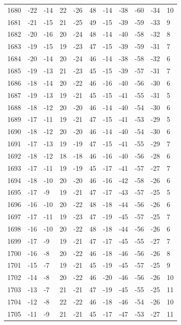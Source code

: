 \begin{table}[H]
\begin{tabular}{lllllllllll}
1680 & -22 & -14 & 22 & -26 & 48 & -14 & -38 & -60 & -34 & 10 \\
1681 & -21 & -15 & 21 & -25 & 49 & -15 & -39 & -59 & -33 & 9 \\
1682 & -20 & -16 & 20 & -24 & 48 & -14 & -40 & -58 & -32 & 8 \\
1683 & -19 & -15 & 19 & -23 & 47 & -15 & -39 & -59 & -31 & 7 \\
1684 & -20 & -14 & 20 & -24 & 46 & -14 & -38 & -58 & -32 & 6 \\
1685 & -19 & -13 & 21 & -23 & 45 & -15 & -39 & -57 & -31 & 7 \\
1686 & -18 & -14 & 20 & -22 & 46 & -16 & -40 & -56 & -30 & 6 \\
1687 & -19 & -13 & 19 & -21 & 45 & -15 & -41 & -55 & -31 & 5 \\
1688 & -18 & -12 & 20 & -20 & 46 & -14 & -40 & -54 & -30 & 6 \\
1689 & -17 & -11 & 19 & -21 & 47 & -15 & -41 & -53 & -29 & 5 \\
1690 & -18 & -12 & 20 & -20 & 46 & -14 & -40 & -54 & -30 & 6 \\
1691 & -17 & -13 & 19 & -19 & 47 & -15 & -41 & -55 & -29 & 7 \\
1692 & -18 & -12 & 18 & -18 & 46 & -16 & -40 & -56 & -28 & 6 \\
1693 & -17 & -11 & 19 & -19 & 45 & -17 & -41 & -57 & -27 & 7 \\
1694 & -18 & -10 & 20 & -20 & 46 & -16 & -42 & -58 & -26 & 6 \\
1695 & -17 & -9 & 19 & -21 & 47 & -17 & -43 & -57 & -25 & 5 \\
1696 & -16 & -10 & 20 & -22 & 48 & -18 & -44 & -56 & -26 & 6 \\
1697 & -17 & -11 & 19 & -23 & 47 & -19 & -45 & -57 & -25 & 7 \\
1698 & -16 & -10 & 20 & -22 & 48 & -18 & -44 & -56 & -26 & 6 \\
1699 & -17 & -9 & 19 & -21 & 47 & -17 & -45 & -55 & -27 & 7 \\
1700 & -16 & -8 & 20 & -22 & 46 & -18 & -46 & -56 & -26 & 8 \\
1701 & -15 & -7 & 19 & -21 & 45 & -19 & -45 & -57 & -25 & 9 \\
1702 & -14 & -8 & 20 & -22 & 46 & -20 & -46 & -56 & -26 & 10 \\
1703 & -13 & -7 & 21 & -21 & 47 & -19 & -45 & -55 & -25 & 11 \\
1704 & -12 & -8 & 22 & -22 & 46 & -18 & -46 & -54 & -26 & 10 \\
1705 & -11 & -9 & 21 & -21 & 45 & -17 & -47 & -53 & -27 & 11 \\

\end{tabular}
\end{table}
